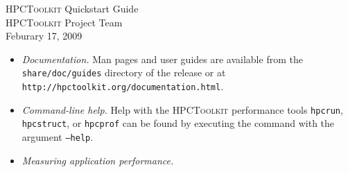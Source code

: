 \documentclass[10pt]{article}
\newcommand{\HPCToolkit}{\textsc{HPCToolkit}}
\begin{document}


\newcommand\lindent{\hbox to 3ex{\hfil}}


\begin{center}
{\Large \HPCToolkit{} Quickstart Guide}\\[1ex]
{\HPCToolkit{} Project Team}\\
Feburary 17, 2009
\end{center}



\begin{itemize}
\item{\em Documentation.} Man pages and user guides are available from the {\tt share/doc/guides} directory of the release or at {\tt http://hpctoolkit.org/documentation.html}.  
\item {\em Command-line help.} Help with the \HPCToolkit{} performance tools {\tt hpcrun}, {\tt hpcstruct}, or {\tt hpcprof} can be found by executing the command with the argument {\tt --help}.
\item{ \em Measuring application performance.}


\end{itemize}
\end{document}
